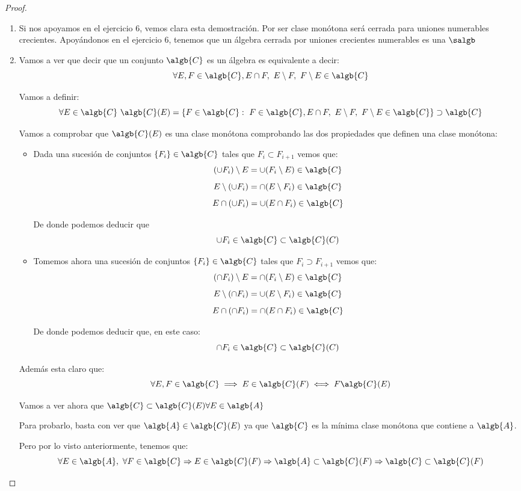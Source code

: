 \begin{problem}[14]
\begin{proof}
\begin{enumerate}
\item Si nos apoyamos en el ejercicio 6, vemos clara esta demostración. Por ser clase monótona será cerrada para uniones numerables crecientes. Apoyándonos en el ejercicio 6, tenemos que un álgebra cerrada por uniones crecientes numerables es una $\salgb$

\item Vamos a ver que decir que un conjunto $\algb{C}$ es un álgebra es equivalente a decir:
\[\forall E,F \in \algb{C}, E\cap F, \ E\setminus F, \ F\setminus E \in \algb{C}\]

Vamos a definir:
\[\forall E \in \algb{C} \ \algb{C}(E)=\{F \in \algb{C}: \ F \in \algb{C}, E\cap F, \ E\setminus F, \ F\setminus E \in \algb{C}\} \supset \algb{C}\]

Vamos a comprobar que $\algb{C}(E)$ es una clase monótona comprobando las dos propiedades que definen una clase monótona:
\begin{itemize}
\item Dada una sucesión de conjuntos $\{F_i\} \in \algb{C}$ tales que $F_i \subset F_{i+1}$ vemos que:
\ppart \[(\cup F_i)\setminus E = \cup (F_i \setminus E) \in \algb{C}\]
\ppart \[E \setminus (\cup F_i) = \cap(E \setminus F_i) \in \algb{C}\]
\ppart \[E \cap (\cup F_i) = \cup (E \cap F_i) \in \algb{C}\]

De donde podemos deducir que 
\[\cup F_i \in \algb{C} \subset \algb{C}(C)\]

\item Tomemos ahora una sucesión de conjuntos $\{F_i\}\in \algb{C}$ tales que $F_i \supset F_{i+1}$ vemos que:
\ppart \[(\cap F_i)\setminus E = \cap (F_i \setminus E) \in \algb{C}\]
\ppart \[E \setminus (\cap F_i) = \cup(E\setminus F_i) \in \algb{C}\]
\ppart \[E \cap (\cap F_i) = \cap (E \cap F_i)\in \algb{C}\]

De donde podemos deducir que, en este caso:
\[\cap F_i \in \algb{C} \subset \algb{C}(C)\]
\end{itemize} 

Además esta claro que:
\[\forall E,F \in \algb{C} \implies E\in \algb{C}(F) \iff F \algb{C}(E)\]

Vamos a ver ahora que $\algb{C} \subset \algb{C}(E) \forall E \in \algb{A}$

Para probarlo, basta con ver que $\algb{A} \in \algb{C}(E)$ ya que $\algb{C}$ es la mínima clase monótona que contiene a $\algb{A}$.

Pero por lo visto anteriormente, tenemos que:
\[\forall E \in \algb{A}, \ \forall F \in \algb{C} \Rightarrow E \in \algb{C}(F) \Rightarrow \algb{A} \subset \algb{C}(F) \Rightarrow \algb{C} \subset \algb{C}(F)\]

\end{enumerate}
\end{proof}
\end{problem}

